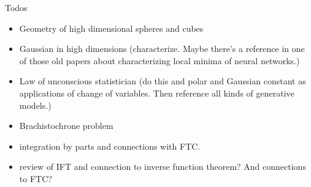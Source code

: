 \documentclass{book}
\begin{document}
Todos
\begin{itemize}
  \item Geometry of high dimensional spheres and cubes
  \item Gaussian in high dimensions (characterize. Maybe there's a reference in one of those old papers about characterizing local minima of neural networks.) 
  \item Law of unconscious statistician (do this and polar and Gaussian constant as applications of change of variables. Then reference all kinds of generative models.) 
  \item Brachistochrone problem
  \item integration by parts and connections with FTC.
  \item review of IFT and connection to inverse function theorem? And connections to FTC?
\end{itemize}
\end{document}
